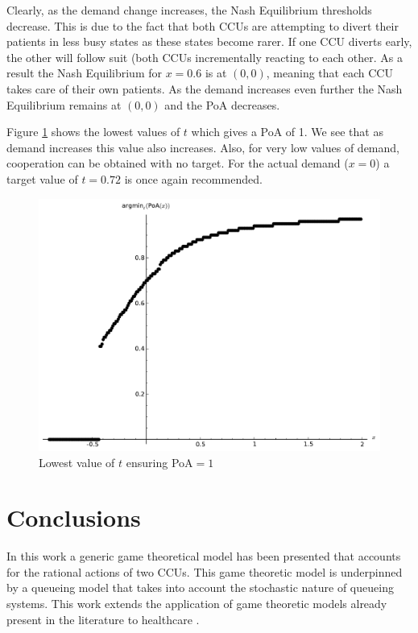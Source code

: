 \documentclass{article}
\begin{document}
Clearly, as the demand change increases, the Nash Equilibrium thresholds decrease.
This is due to the fact that both CCUs are attempting to divert their patients in less busy states as these states become rarer.
If one CCU diverts early, the other will follow suit (both CCUs incrementally reacting to each other.
As a result the Nash Equilibrium for $x=0.6$ is at $(0,0)$, meaning that each CCU takes care of their own patients.
As the demand increases even further the Nash Equilibrium remains at $(0,0)$ and the PoA decreases.

Figure \ref{mintargetvdemandmodel2} shows the lowest values of $t$ which gives a PoA of 1.
We see that as demand increases this value also increases.
Also, for very low values of demand, cooperation can be obtained with no target.
For the actual demand ($x=0$) a target value of $t=0.72$ is once again recommended.

\begin{figure}[!htbp]
\begin{center}
\includegraphics[width=12cm]{./Images/argminPoAmodel2.pdf}
\caption{Lowest value of $t$ ensuring PoA$=1$} \label{mintargetvdemandmodel2}
\end{center}
\end{figure}

\section{Conclusions}\label{conclusions}

In this work a generic game theoretical model has been presented that accounts for the rational actions of two CCUs.
This game theoretic model is underpinned by a queueing model that takes into account the stochastic nature of queueing systems.
This work extends the application of game theoretic models already present in the literature to healthcare \cite{li2002cooperative, xie2006note}.
\end{document}
